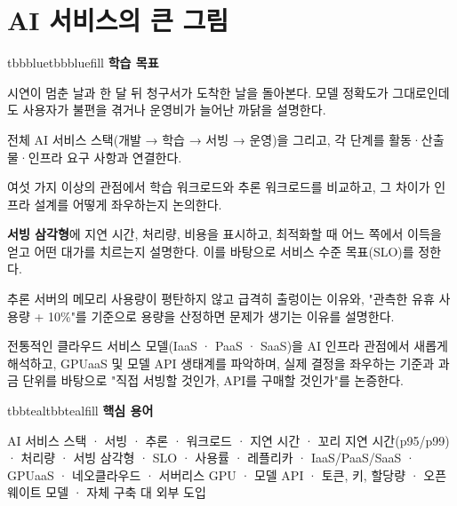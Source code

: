 \setcounter{chapter}{0}
\chapter{AI 서비스의 큰 그림}

\begin{calloutbox}{tbbblue}{tbbbluefill}
{\normalsize\bfseries\color{tbbblue}학습 목표}\par\vspace{3pt}
\begin{tbbitemize}
  \item 시연이 멈춘 날과 한 달 뒤 청구서가 도착한 날을 돌아본다. 모델 정확도가 그대로인데도 사용자가 불편을 겪거나 운영비가 늘어난 까닭을 설명한다.
  \item 전체 AI 서비스 스택(개발 → 학습 → 서빙 → 운영)을 그리고, 각 단계를 활동·산출물·인프라 요구 사항과 연결한다.
  \item 여섯 가지 이상의 관점에서 학습 워크로드와 추론 워크로드를 비교하고, 그 차이가 인프라 설계를 어떻게 좌우하는지 논의한다.
  \item \textbf{서빙 삼각형}에 지연 시간, 처리량, 비용을 표시하고, 최적화할 때 어느 쪽에서 이득을 얻고 어떤 대가를 치르는지 설명한다. 이를 바탕으로 서비스 수준 목표(SLO)를 정한다.
  \item 추론 서버의 메모리 사용량이 평탄하지 않고 급격히 출렁이는 이유와, "관측한 유휴 사용량 + 10\%"를 기준으로 용량을 산정하면 문제가 생기는 이유를 설명한다.
  \item 전통적인 클라우드 서비스 모델(IaaS · PaaS · SaaS)을 AI 인프라 관점에서 새롭게 해석하고, GPUaaS 및 모델 API 생태계를 파악하며, 실제 결정을 좌우하는 기준과 과금 단위를 바탕으로 "직접 서빙할 것인가, API를 구매할 것인가"를 논증한다.
\end{tbbitemize}
\end{calloutbox}

\vspace{5.0pt}

\begin{calloutbox}{tbbteal}{tbbtealfill}
{\normalsize\bfseries\color{tbbteal}핵심 용어}\par\vspace{3pt}
AI 서비스 스택 · 서빙 · 추론 · 워크로드 · 지연 시간 · 꼬리 지연 시간(p95/p99) · 처리량 · 서빙 삼각형 · SLO · 사용률 · 레플리카 · IaaS/PaaS/SaaS · GPUaaS · 네오클라우드 · 서버리스 GPU · 모델 API · 토큰, 키, 할당량 · 오픈 웨이트 모델 · 자체 구축 대 외부 도입
\end{calloutbox}

